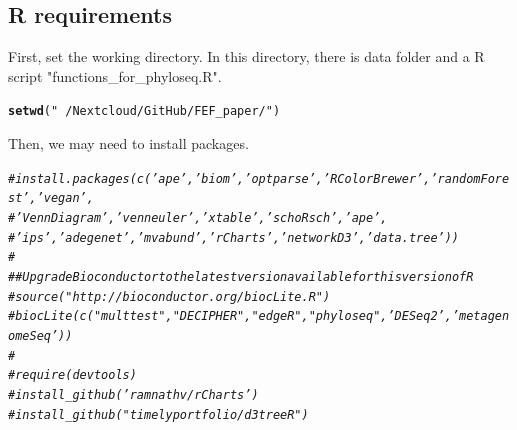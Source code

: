 \documentclass[12pt]{article}\usepackage[]{graphicx}\usepackage[]{color}
\makeatletter
\newcommand{\hlstr}[1]{\textcolor[rgb]{0.192,0.494,0.8}{#1}}%
\newcommand{\hlcom}[1]{\textcolor[rgb]{0.678,0.584,0.686}{\textit{#1}}}%
\newcommand{\hlstd}[1]{\textcolor[rgb]{0.345,0.345,0.345}{#1}}%
\newcommand{\hlkwd}[1]{\textcolor[rgb]{0.737,0.353,0.396}{\textbf{#1}}}%
\newenvironment{kframe}{%
 \def\at@end@of@kframe{}%
 \ifinner\ifhmode%
  \def\at@end@of@kframe{\end{minipage}}%
  \begin{minipage}{\columnwidth}%
 \fi\fi%
 \def\FrameCommand##1{\hskip\@totalleftmargin \hskip-\fboxsep
 \colorbox{shadecolor}{##1}\hskip-\fboxsep
     \hskip-\linewidth \hskip-\@totalleftmargin \hskip\columnwidth}%
 \MakeFramed {\advance\hsize-\width
   \@totalleftmargin\z@ \linewidth\hsize
   \@setminipage}}%
 {\par\unskip\endMakeFramed%
 \at@end@of@kframe}
\newenvironment{knitrout}{}{} %
\numberwithin{figure}{section}
\makeatother
\begin{document}
\subsection{R requirements}

First, set the working directory. In this directory, there is data folder and a R script "functions\_for\_phyloseq.R".

\begin{knitrout}\small
{}\color{fgcolor}\begin{kframe}
\begin{alltt}
\hlkwd{setwd}\hlstd{(}\hlstr{"~/Nextcloud/GitHub/FEF_paper/"}\hlstd{)}
\end{alltt}
\end{kframe}
\end{knitrout}

Then, we may need to install packages.
\begin{knitrout}\small
{}\color{fgcolor}\begin{kframe}
\begin{alltt}
\hlcom{#  install.packages(c('ape', 'biom', 'optparse', 'RColorBrewer', 'randomForest',  'vegan',}
\hlcom{#                    'VennDiagram', 'venneuler', 'xtable', 'schoRsch', 'ape',}
\hlcom{#                   'ips', 'adegenet', 'mvabund', 'rCharts', 'networkD3', 'data.tree'))}
\hlcom{# }
\hlcom{# # Upgrade Bioconductor to the latest version available for this version of R}
\hlcom{# source("http://bioconductor.org/biocLite.R")}
\hlcom{# biocLite(c("multtest", "DECIPHER", "edgeR", "phyloseq", 'DESeq2', 'metagenomeSeq'))}
\hlcom{# }
\hlcom{# require(devtools)}
\hlcom{# install_github('ramnathv/rCharts')}
\hlcom{# install_github("timelyportfolio/d3treeR")}
\end{alltt}
\end{kframe}
\end{knitrout}
\end{document}
